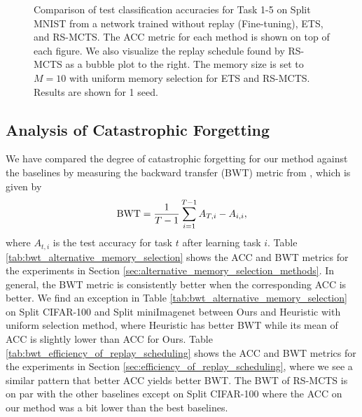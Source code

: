 \begin{figure}[t]
  \centering
  \setlength{\figwidth}{0.25\textwidth}
  \setlength{\figheight}{.14\textheight}
  
  \vspace{-3mm}
  \caption{ Comparison of test classification accuracies for Task 1-5 on Split MNIST from a network trained without replay (Fine-tuning), ETS, and RS-MCTS. The ACC metric for each method is shown on top of each figure. We also visualize the replay schedule found by RS-MCTS as a bubble plot to the right. The memory size is set to $M=10$ with uniform memory selection for ETS and RS-MCTS. Results are shown for 1 seed. 
  }
  \vspace{-3mm}
  \label{fig:split_mnist_task_accuracies_and_bubble_plot}
\end{figure}

\subsection{Analysis of Catastrophic Forgetting}\label{app:analysis_of_catastrophic_forgetting}

We have compared the degree of catastrophic forgetting for our method against the baselines by measuring the backward transfer (BWT) metric from \citet{lopez2017gradient}, which is given by
\begin{align}
    \textnormal{BWT} = \frac{1}{T-1} \sum_{i=1}^{T-1} A_{T, i} - A_{i, i},
\end{align}
where $A_{t, i}$ is the test accuracy for task $t$ after learning task $i$. Table \ref{tab:bwt_alternative_memory_selection} shows the ACC and BWT metrics for the experiments in Section \ref{sec:alternative_memory_selection_methods}. In general, the BWT metric is consistently better when the corresponding ACC is better. We find an exception in Table \ref{tab:bwt_alternative_memory_selection} on Split CIFAR-100 and Split miniImagenet between Ours and Heuristic with uniform selection method, where Heuristic has better BWT while its mean of ACC is slightly lower than ACC for Ours. Table \ref{tab:bwt_efficiency_of_replay_scheduling} shows the ACC and BWT metrics for the experiments in Section \ref{sec:efficiency_of_replay_scheduling}, where we see a similar pattern that better ACC yields better BWT. The BWT of RS-MCTS is on par with the other baselines except on Split CIFAR-100 where the ACC on our method was a bit lower than the best baselines.



